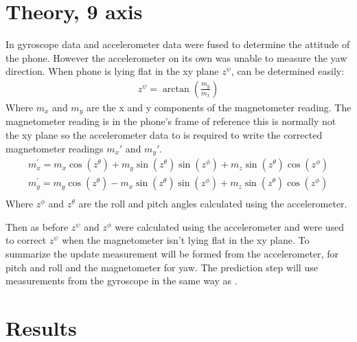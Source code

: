\documentclass[letterpaper,10pt,english]{jupyterBook}
\begin{document}
\section{Theory, 9 axis}
\label{\detokenize{7RealData:theory-9-axis}}
\sphinxAtStartPar
In {\hyperref[\detokenize{5IMU::doc}]{}} gyroscope data and accelerometer data were fused to determine the attitude of the phone. However the accelerometer on its own was unable to measure the yaw direction. When phone is lying flat in the xy plane \(z^\psi\), can be determined easily:
\begin{equation}\label{equation:7RealData:eq-Magnetometer}
\begin{split}z^\psi = \arctan\left(\frac{m_y}{m_x}\right)\end{split}
\end{equation}
\sphinxAtStartPar
Where \(m_x\) and \(m_y\) are the x and y components of the magnetometer reading. The magnetometer reading is in the phone’s frame of reference this is normally not the xy plane so the accelerometer data to is required to write the corrected magnetometer readings \(m_x'\) and \(m_y'\).
\begin{equation}\label{equation:7RealData:eq-gyro-correction}
\begin{split}m_x^{'} = m_x \cos(z^\theta) + m_y \sin(z^\theta) \sin(z^\phi) + m_z \sin(z^\theta) \cos(z^\phi)\\
m_y^{'} = m_y \cos(z^\theta) - m_x \sin(z^\theta) \sin(z^\phi) + m_z \sin(z^\theta) \cos(z^\phi)\\\end{split}
\end{equation}
\sphinxAtStartPar
Where \(z^\phi\) and \(z^\theta\) are the roll and pitch angles calculated using the accelerometer.

\sphinxAtStartPar
Then as before \(z^\psi\) and \(z^\phi\) were calculated using the accelerometer and were used to correct \(z^\psi\) when the magnetometer isn’t lying flat in the xy plane. To summarize the update measurement will be formed from the accelerometer, for pitch and roll and the magnetometer for yaw. The prediction step will use measurements from the gyroscope in the same way as {\hyperref[\detokenize{5IMU::doc}]{}}.


\section{Results}
\label{\detokenize{7RealData:results}}
\end{document}
